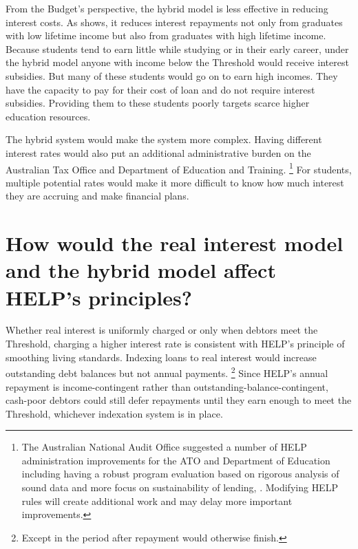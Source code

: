 \documentclass[embargoed]{grattan}
\begin{document}
From the Budget's perspective, the hybrid model is less effective in reducing interest costs.
As  shows, it reduces interest repayments not only from graduates with low lifetime income but also from graduates with high lifetime income.
Because students tend to earn little while studying or in their early career, under the hybrid model anyone with income below the \gls{Threshold} would receive interest subsidies.
But many of these students would go on to earn high incomes.
They have the capacity to pay for their cost of loan and do not require interest subsidies.
Providing them to these students poorly targets scarce higher education resources.

The hybrid system would make the system more complex.
Having different interest rates would also put an additional administrative burden on the Australian Tax Office and Department of Education and Training.%
\footnote{The Australian National Audit Office suggested a number of \gls{HELP} administration improvements for the \gls{ATO} and Department of Education including having a robust program evaluation based on rigorous analysis of sound data and more focus on sustainability of lending, \textcite[][7]{ANAO2016AdministrationHigherEducation}.
Modifying \gls{HELP} rules will create additional work and may delay more important improvements.} 
For students, multiple potential rates would make it more difficult to know how much interest they are accruing and make financial plans.

\section[How would the real interest model and the hybrid model affect {HELP}'s principles?]{How would the real interest model and the hybrid model affect \gls{HELP}'s principles?}\label{how-would-the-real-interest-model-and-the-hybrid-model-affect-helps-principles}

Whether real interest is uniformly charged or only when debtors meet the \gls{Threshold}, charging a higher interest rate is consistent with \gls{HELP}'s principle of smoothing living standards.
Indexing loans to real interest would increase outstanding debt balances but not annual payments.%
\footnote{Except in the period after repayment would otherwise finish.} 
Since \gls{HELP}'s annual repayment is income-contingent rather than outstanding-balance-contingent, cash-poor debtors could still defer repayments until they earn enough to meet the \gls{Threshold}, whichever indexation system is in place.
\end{document}
